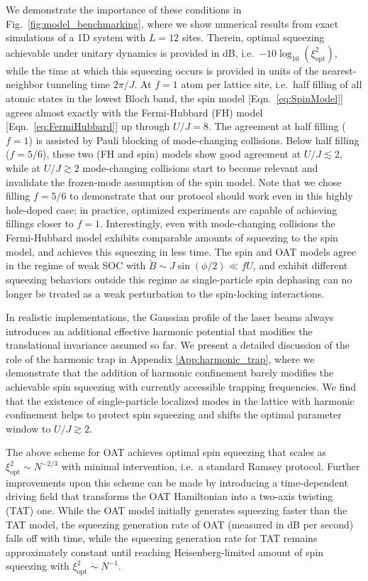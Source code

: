 \documentclass[aps,prx,superscriptaddress,notitlepage,twocolumn,longbibliography]{revtex4-1}
\renewcommand{\t}{\text} %
\begin{document}
We demonstrate the importance of these conditions in Fig.~\ref{fig:model_benchmarking}, where we show numerical results from exact simulations of a 1D system with $L=12$ sites.
Therein, optimal squeezing achievable under unitary dynamics is provided in dB, i.e.~$-10\log_{10}(\xi_{\t{opt}}^2)$, while the time at which this squeezing occurs is provided in units of the nearest-neighbor tunneling time $2\pi/J$.
At $f=1$ atom per lattice site, i.e.~half filling of all atomic states in the lowest Bloch band, the spin model [Eqn.~\eqref{eq:SpinModel}] agrees almost exactly with the Fermi-Hubbard (FH) model [Eqn.~\eqref{eq:FermiHubbard}] up through $U/J=8$. The agreement at half filling ($f=1$) is assisted by Pauli blocking of mode-changing collisions.
Below half filling ($f=5/6$), these two (FH and spin) models show good agreement at $U/J\lesssim2$, while at $U/J\gtrsim2$ mode-changing collisions start to become relevant and invalidate the frozen-mode assumption of the spin model.
Note that we chose filling $f=5/6$ to demonstrate that our protocol should work even in this highly hole-doped case; in practice, optimized experiments are capable of achieving fillings closer to $f=1$\cite{brown2017spinimbalance}.
Interestingly, even with mode-changing collisions the Fermi-Hubbard model exhibits comparable amounts of squeezing to the spin model, and achieves this squeezing in less time.
The spin and OAT models agree in the regime of weak SOC with $\widetilde{B}\sim J\sin(\phi/2)\ll fU$, and exhibit different squeezing behaviors outside this regime as single-particle spin dephasing can no longer be treated as a weak perturbation to the spin-locking  interactions.

In realistic implementations, the Gaussian profile of the laser beams always introduces an additional effective harmonic potential that modifies the translational invariance assumed so far.
We present a detailed discussion of the role of the harmonic trap in Appendix \ref{App:harmonic_trap}, where we demonstrate that the addition of harmonic confinement barely modifies the achievable spin squeezing with currently accessible trapping frequencies.
We find that the existence of single-particle localized modes in the lattice with harmonic confinement\cite{Rey2005,Pupillo2006} helps to protect spin squeezing and shifts the optimal parameter window to $U/J\gtrsim 2$.

The above scheme for OAT achieves optimal spin squeezing that scales as $\xi^2_{\t{opt}}\sim N^{-2/3}$ with minimal intervention, i.e.~a standard Ramsey protocol.
Further improvements upon this scheme can be made by introducing a time-dependent driving field that transforms the OAT Hamiltonian into a two-axis twisting (TAT) one.
While the OAT model initially generates squeezing faster than the TAT model, the squeezing generation rate of OAT (measured in dB per second) falls off with time, while the squeezing generation rate for TAT remains approximately constant until reaching Heisenberg-limited amount of spin squeezing with $\xi^2_{\t{opt}}\sim N^{-1}$\cite{kitagawa1993squeezed, supplementary_material}.
\end{document}
